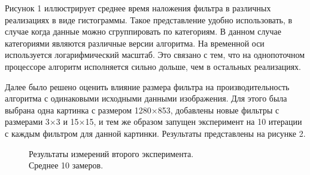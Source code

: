 Рисунок 1 иллюстрирует среднее время наложения фильтра в различных реализациях в виде гистограммы. Такое представление удобно использовать, 
в случае когда данные можно сгруппировать по категориям. В данном случае категориями являются различные версии алгоритма. На временной 
оси используется логарифмический масштаб. Это связано с тем, что на однопоточном процессоре алгоритм исполняется сильно дольше, чем в 
остальных реализациях.

Далее было решено оценить влияние размера фильтра на производительность алгоритма с одинаковыми исходными данными изображения. Для 
этого была выбрана одна картинка с размером 1280×853, добавлены новые фильтры с размерами 3×3 и 15×15, и тем же образом запущен эксперимент 
на 10 итерации с каждым фильтром для данной картинки. Результаты представлены на рисунке 2.

\begin{figure}[ht]
\begin{center}
\caption{\label{com-Youtube}Результаты измерений второго эксперимента.\\Среднее 10 замеров.}
\end{center}
\end{figure}









